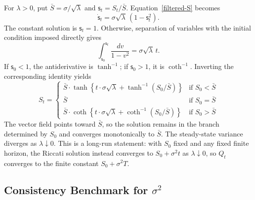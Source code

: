 \documentclass[mnsc]{informs3}
\begin{document}
\begin{APPENDICES}
For $\lambda>0$, put $\bar S=\sigma/\sqrt\lambda$ and
$\mathsf s_t=S_t/\bar S$. Equation~\eqref{filtered-S} becomes
\[
\dot{\mathsf s}_t=\sigma\sqrt\lambda\,(1-\mathsf s_t^2).
\]
The constant solution is $\mathsf s_t=1$. Otherwise, separation of variables
with the initial condition imposed directly gives
\[
\int_{\mathsf s_0}^{\mathsf s_t}\frac{dv}{1-v^2}=\sigma\sqrt\lambda\,t.
\]
If $\mathsf s_0<1$, the antiderivative is $\tanh^{-1}$; if $\mathsf s_0>1$, it is
$\coth^{-1}$. Inverting the corresponding identity yields
\begin{equation*}
	S_t =
	\begin{cases}
        \bar{S} \cdot \tanh\left\{t\cdot\sigma\sqrt{\lambda} +  \tanh^{-1}\left(S_0\big/\bar{S}\right)\right\} & \text{if } S_0 < \bar{S} \\
        \bar{S} & \text{if } S_0 = \bar{S} \\
        \bar{S} \cdot \coth\left\{t\cdot\sigma\sqrt{\lambda} +  \coth^{-1}\left(S_0\big/\bar{S}\right)\right\} & \text{if } S_0 > \bar{S}
	\end{cases}
\end{equation*}
The vector field points toward $\bar S$, so the solution remains in the
branch determined by $S_0$ and converges monotonically to $\bar S$.
The steady-state variance diverges as $\lambda\downarrow0$. {This is a long-run statement: with $S_0$ fixed and any fixed finite horizon, the Riccati solution instead converges to $S_0+\sigma^2t$ as $\lambda\downarrow0$, so $Q_t$ converges to the finite constant $S_0+\sigma^2T$.}


\subsection{Consistency Benchmark for $\sigma^2$}\label{appexidx-normal-benchmark}


\end{APPENDICES}
\end{document}
